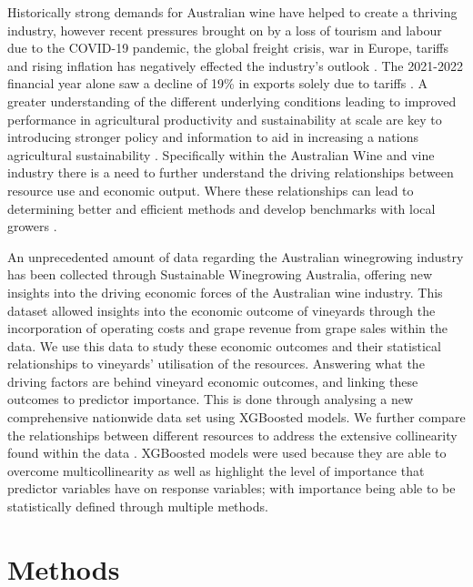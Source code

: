\documentclass[review,12pt,authoryear]{elsarticle}
\begin{document}
\begin{linenumbers}
Historically strong demands for Australian wine have helped to create a thriving industry, however recent pressures brought on by a loss of tourism and labour due to the COVID-19 pandemic, the global freight crisis, war in Europe, tariffs and rising inflation has negatively effected the industry's outlook \citep{wineaustraliaNationalVintageReport2021,wineaustraliaAustralianWineProduction2021}. The 2021-2022 financial year alone saw a decline of 19\% in exports solely due to tariffs \citep{wineaustraliaNationalVintageReport2022}. A greater understanding of the different underlying conditions leading to improved performance in agricultural productivity and sustainability at scale are key to  introducing stronger policy and information to aid in increasing a nations agricultural sustainability \citep{oecdInnovationProductivitySustainability2019}. Specifically within the Australian Wine and vine industry there is a need to further understand the driving relationships between resource use and economic output. Where these relationships can lead to determining better and efficient methods and develop benchmarks with local growers \citep{lukemanciniUnderstandingAustralianWine2020}.
\par
An unprecedented amount of data regarding the Australian winegrowing industry has been collected through Sustainable Winegrowing Australia, offering new insights into the driving economic forces of the Australian wine industry. This dataset allowed insights into the economic outcome of vineyards through the incorporation of operating costs and grape revenue from grape sales within the data. We use this data to study these economic outcomes and their statistical relationships to vineyards' utilisation of the resources. Answering what the driving factors are behind vineyard economic outcomes, and linking these outcomes to predictor importance. This is done through analysing a new comprehensive nationwide data set using XGBoosted models. We further compare the relationships between different resources to address the extensive collinearity found within the data \citep{chenXGBoostScalableTree2016}. XGBoosted models were used because they are able to overcome multicollinearity as well as highlight the level of importance that predictor variables have on response variables; with importance being able to be statistically defined through multiple methods.

\section{Methods}


\end{linenumbers}
\end{document}
